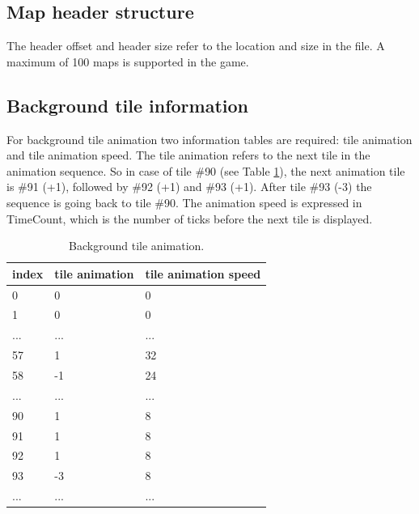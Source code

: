 \documentclass[book.tex]{subfiles}
\begin{document}
\subsection{Map header structure}
The header offset and header size refer to the location and size in the  file. A maximum of 100 maps is supported in the game.\\
\par
\begin{minipage}{\textwidth}
 \par
 \end{minipage}

\subsection{Background tile information}
For background tile animation two information tables are required: tile animation and tile animation speed. The tile animation refers to the next tile in the animation sequence. So in case of tile \#90 (see Table \ref{table:background tile anim}), the next animation tile is \#91 (+1), followed by \#92 (+1) and \#93 (+1). After tile \#93 (-3) the sequence is going back to tile \#90. The animation speed is expressed in TimeCount, which is the number of ticks before the next tile is displayed. \\
 \begin{table}[H]
  \begin{tabularx}{\textwidth}[c]{XXX}
  \hline
  \textbf{index} & \textbf{tile animation} & \textbf{tile animation speed}   \\ \hline
  0             & 0          & 0    \\
  1             & 0          & 0    \\
  ...             & ...          & ...    \\
  57             & 1          & 32    \\
  58             & -1          & 24    \\
  ...             & ...          & ...    \\
  90             & 1          & 8    \\
  91            & 1          & 8    \\
  92             & 1          & 8    \\
  93             & -3          & 8    \\
  ...             & ...          & ...    \\
  \end{tabularx}
  \caption{Background tile animation.}
  \label{table:background tile anim}
  \end{table}
\end{document}
